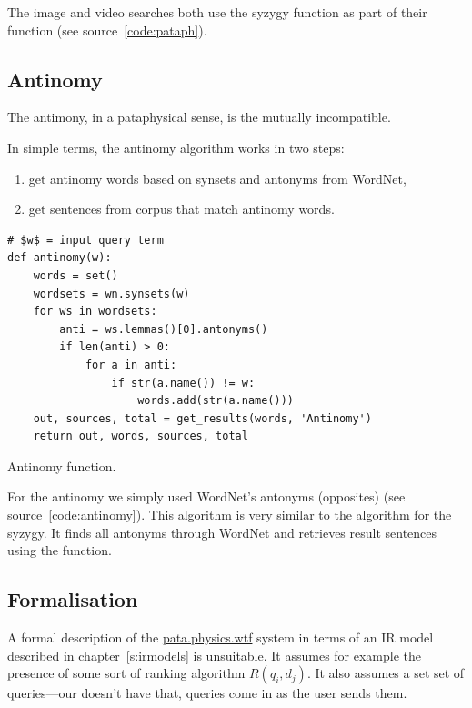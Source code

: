 
The image and video searches both use the syzygy function as part of their  function (see source~\ref{code:pataph}).


\subsection{Antinomy}

The antimony, in a pataphysical sense, is the mutually incompatible.

In simple terms, the antinomy algorithm works in two steps:
\begin{enumerate}
  \item get antinomy words based on synsets and antonyms from WordNet,
  \item get sentences from corpus that match antinomy words.
\end{enumerate}

\begin{listing}
  \begin{verbatim}
# $w$ = input query term
def antinomy(w):
    words = set()
    wordsets = wn.synsets(w)
    for ws in wordsets:
        anti = ws.lemmas()[0].antonyms()
        if len(anti) > 0:
            for a in anti:
                if str(a.name()) != w:
                    words.add(str(a.name()))
    out, sources, total = get_results(words, 'Antinomy')
    return out, words, sources, total
  \end{verbatim}
\caption{Antinomy function.}
\label{code:antinomy}
\end{listing}

For the antinomy we simply used WordNet's antonyms (opposites) (see source~\ref{code:antinomy}). This algorithm is very similar to the algorithm for the syzygy. It finds all antonyms through WordNet and retrieves result sentences using the  function.


\subsection{Formalisation}

A formal description of the \url{pata.physics.wtf} system in terms of an \ac{IR} model described in chapter~\ref{s:irmodels} is unsuitable. It assumes for example the presence of some sort of ranking algorithm $R(q_i, d_j)$. It also assumes a set set of queries---our doesn't have that, queries come in as the user sends them.

